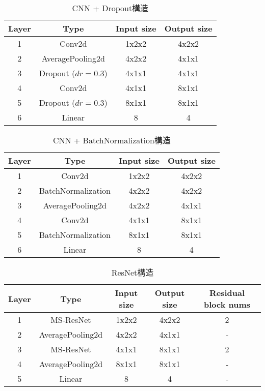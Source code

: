 \begin{table}[htb]
    \centering
    \caption{CNN + Dropout構造}
    \label{tab:model:parameter:cnn:dropout}
    \begin{tabular}{cccc}
        \hline
        \textbf{Layer}& \textbf{Type}&\textbf{Input size} & \textbf{Output size}\\
        \hline
        1   & Conv2d & 1x2x2 & 4x2x2 \\
        2 & AveragePooling2d & 4x2x2 & 4x1x1 \\
        3 & Dropout ($dr=0.3$) & 4x1x1 & 4x1x1 \\
        4 & Conv2d & 4x1x1 & 8x1x1 \\
        5 & Dropout ($dr=0.3$) & 8x1x1 & 8x1x1 \\
        6 & Linear & 8 & 4 \\
        \hline
    \end{tabular}
\end{table}

\begin{table}[htb]
    \centering
    \caption{CNN + BatchNormalization構造}
    \label{tab:model:parameter:cnn:batchnormalization}
    \begin{tabular}{cccc}
        \hline
        \textbf{Layer}& \textbf{Type}&\textbf{Input size} & \textbf{Output size}\\
        \hline
        1   & Conv2d & 1x2x2 & 4x2x2 \\
        2 & BatchNormalization & 4x2x2 & 4x2x2 \\
        3 & AveragePooling2d & 4x2x2 & 4x1x1 \\
        4 & Conv2d & 4x1x1 & 8x1x1 \\
        5 & BatchNormalization & 8x1x1 & 8x1x1 \\
        6 & Linear & 8 & 4 \\
        \hline
    \end{tabular}
\end{table}


\begin{table}[htb]
    \centering
    \caption{ResNet構造}
    \label{tab:model:parameter:resnet}
    \begin{tabular}{ccccc}
        \hline
        \textbf{Layer}& \textbf{Type}&\textbf{Input size} & \textbf{Output size} & \textbf{Residual block nums}\\
        \hline
        1   & MS-ResNet & 1x2x2 & 4x2x2 & 2\\
        2 & AveragePooling2d & 4x2x2 & 4x1x1 & - \\
        3 & MS-ResNet & 4x1x1 & 8x1x1 & 2\\
        4 & AveragePooling2d & 8x1x1 & 8x1x1 & - \\
        5 & Linear & 8 & 4 & - \\
        \hline
    \end{tabular}
\end{table}


